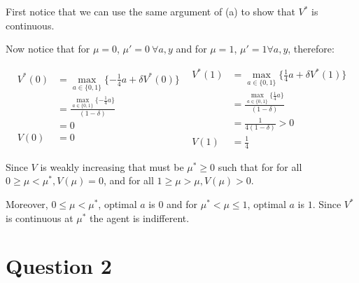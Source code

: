 \documentclass{article}
\begin{document}
First notice that we can use the same argument of (a) to show that $V^*$ is continuous.

Now notice that for $\mu = 0$, $\mu' = 0\ \forall a,y$ and for $\mu = 1$,
$\mu' = 1 \forall a,y$, therefore:

\[
  \begin{split}
    V^*(0) & =  \max_{a \in \{0, 1\}}\{- \frac{1}{4}a + \delta V^*(0) \} \\
           & = \frac{\max_{a \in \{0, 1\}}\{- \frac{1}{4}a\}}{(1 - \delta)} \\
           & = 0 \\
    V(0)   & = 0
  \end{split}
  \ \    
  \begin{split}
    V^*(1) & =  \max_{a \in \{0, 1\}}\{\frac{1}{4}a + \delta V^*(1) \} \\
           & = \frac{\max_{a \in \{0, 1\}}\{\frac{1}{4}a\}}{(1 - \delta)} \\
           & = \frac{1}{4(1 - \delta)} > 0 \\
    V(1)   & = \frac{1}{4}
  \end{split}
\]

Since $V$ is weakly increasing that must be $\mu^* \ge 0$ such that for for all 
$0 \ge \mu < \mu^*, V(\mu) = 0$, and for all $1 \ge \mu > \mu, V(\mu) > 0$.

Moreover, $0 \le \mu < \mu^*$, optimal $a$ is $0$ and for $\mu^* < \mu \le 1$, 
optimal $a$ is $1$. Since $V^*$ is continuous at $\mu^*$ the agent is indifferent.

\section{Question 2}
\label{sec:Question 2}
\end{document}
